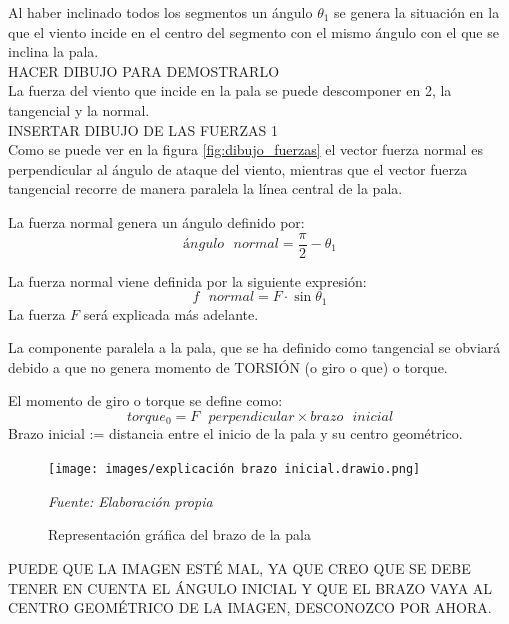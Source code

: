 Al haber inclinado todos los segmentos un ángulo $ \theta_1 $ se genera la situación en la que el viento incide en el centro del segmento con el mismo ángulo con el que se inclina la pala. \\

HACER DIBUJO PARA DEMOSTRARLO \\

La fuerza del viento que incide en la pala se puede descomponer en 2, la tangencial y la normal. \\

INSERTAR DIBUJO DE LAS FUERZAS 1 \\ %

Como se puede ver en la figura \ref{fig:dibujo_fuerzas} el vector fuerza normal es perpendicular al ángulo de ataque del viento, mientras que el vector fuerza tangencial recorre de manera paralela la línea central de la pala.

 \begin{definicion}
 La fuerza normal genera un ángulo definido por:
 $$ ángulo \text{ } normal = \dfrac{\pi}{2} - \theta_1 $$
 
 \end{definicion}

 \begin{definicion}
 La fuerza normal viene definida por la siguiente expresión:
  $$ f \text{ } normal = F \cdot \sin{\theta_1}$$
   La fuerza $F$ será explicada más adelante.
  \label{def:fuerza_normal_inicial}
 \end{definicion}
 
  La componente paralela a la pala, que se ha definido como tangencial se obviará debido a que no genera momento de TORSIÓN (o giro o que) o torque. 
  
  \begin{definicion}
El momento de giro o torque se define como:
 $$ torque_0 = F \text{ } perpendicular \times brazo \text{ } inicial$$
 \label{def:torque_inicial}
 Brazo inicial := distancia entre el inicio de la pala y su centro geométrico. \\
 \end{definicion}
 

     \textbf{}
    \begin{figure}[H]
    \centering
    \texttt{[image: images/explicación brazo inicial.drawio.png]}
    \caption{Representación gráfica del brazo de la pala}
    \label{fig:exp_brazo_inicial}
    \textit{Fuente: Elaboración propia}
\end{figure}
 PUEDE QUE LA IMAGEN ESTÉ MAL, YA QUE CREO QUE SE DEBE TENER EN CUENTA EL ÁNGULO INICIAL Y QUE EL BRAZO VAYA AL CENTRO GEOMÉTRICO DE LA IMAGEN, DESCONOZCO POR AHORA.
 


